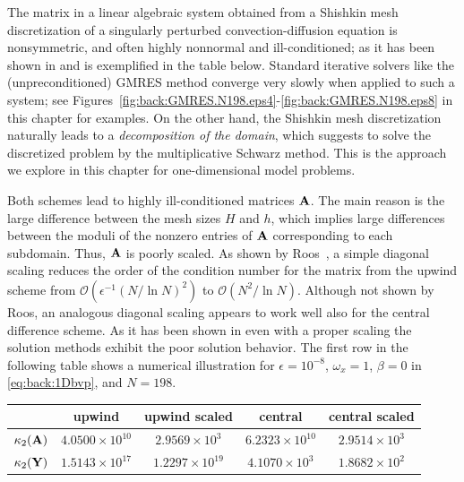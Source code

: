 The matrix in a linear algebraic system obtained from a Shishkin mesh
discretization of a singularly perturbed convection-diffusion equation
is nonsymmetric, and often highly nonnormal and ill-conditioned; as it has been shown in \cite{EchLieSzyTic18} and is exemplified in the table below.
Standard iterative solvers like the (unpreconditioned) GMRES method converge
very slowly when applied to such a system; see Figures~\ref{fig:back:GMRES.N198.eps4}-\ref{fig:back:GMRES.N198.eps8} in this chapter
for examples. On the other hand, the Shishkin mesh discretization naturally
leads to a \emph{decomposition of the domain}, which suggests to solve
the discretized problem by the multiplicative Schwarz method. This is the
approach we explore in this chapter for one-dimensional model problems.


Both schemes lead to highly ill-conditioned matrices $\mathbf{A}$. The main reason is
the large difference between the mesh sizes $H$ and $h$, which implies large
differences between the moduli of the nonzero entries of $\mathbf{A}$ corresponding to
each subdomain. Thus, $\mathbf{A}$ is poorly scaled. As shown by Roos~\cite{Roo96}, a
simple diagonal scaling reduces the order of the condition number for the
matrix from the upwind scheme from $\mathscr{O}(\epsilon^{-1}(N/\ln N)^2)$ to
$\mathscr{O}(N^2/\ln N)$. Although not shown by Roos, an analogous diagonal
scaling appears to work well also for the central difference scheme. As it has been shown in \cite{EchLieSzyTic18} even with a proper scaling the solution methods exhibit the poor solution behavior. The first row in the following table shows a numerical illustration for
$\epsilon=10^{-8}$, $\omega_x=1$, $\beta=0$ in \eqref{eq:back:1Dbvp}, and
$N=198$.
%
\begin{table}[h!]\centering
\begin{tabular}{r|c c c c}
&upwind & upwind scaled & central & central scaled\\
\hline
$\kappa_2(\mathbf{A})$ & $4.0500 \times 10^{10}$ & $2.9569\times 10^{3}$ &
$6.2323 \times 10^{10}$ & $2.9514 \times 10^{3}$\\
$\kappa_2(\mathbf{Y})$ & $1.5143 \times 10^{17}$ & $1.2297 \times 10^{19}$ &
$4.1070\times 10^{3}$ & $1.8682\times 10^{2}$
\end{tabular}
\label{tab:back:poor}
\end{table}

